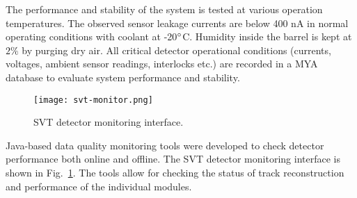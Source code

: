 The performance and stability of the system is tested at various operation temperatures. The observed sensor leakage currents are below 400 nA in normal operating conditions with coolant at -20$\degree$C. Humidity inside the barrel is kept at $2\%$ by purging dry air. All critical detector operational conditions (currents, voltages, ambient sensor readings, interlocks etc.) are recorded in a MYA database \cite{MYA} to evaluate system performance and stability. %

\begin{figure}[hbt] 
\centering 
\texttt{[image: svt-monitor.png]}
\caption{SVT detector monitoring interface.}
\label{fig:svt-monitor}
\end{figure}

Java-based data quality monitoring tools were developed to check detector performance both online and offline. The SVT detector monitoring interface is shown in Fig.~\ref{fig:svt-monitor}. The tools allow for checking the status of track reconstruction and performance of the individual modules. 

